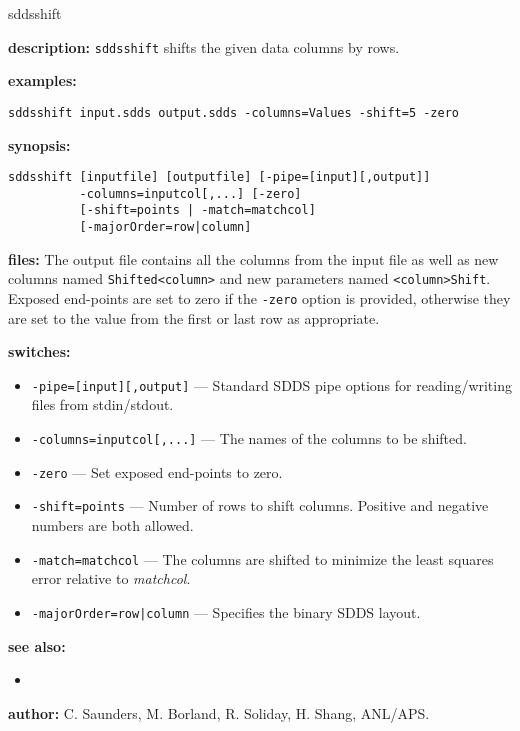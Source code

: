 \begin{sddsprog}{sddsshift}
  \item \textbf{description:} \verb|sddsshift| shifts the given data columns by rows.
  \item \textbf{examples:}
\begin{verbatim}
sddsshift input.sdds output.sdds -columns=Values -shift=5 -zero
\end{verbatim}
  \item \textbf{synopsis:}
\begin{verbatim}
sddsshift [inputfile] [outputfile] [-pipe=[input][,output]]
          -columns=inputcol[,...] [-zero]
          [-shift=points | -match=matchcol]
          [-majorOrder=row|column]
\end{verbatim}
  \item \textbf{files:}
  The output file contains all the columns from the input file as well as new columns named \verb|Shifted<column>| and new parameters named \verb|<column>Shift|. Exposed end-points are set to zero if the \verb|-zero| option is provided, otherwise they are set to the value from the first or last row as appropriate.
  \item \textbf{switches:}
  \begin{itemize}
    \item \verb|-pipe=[input][,output]| --- Standard SDDS pipe options for reading/writing files from stdin/stdout.
    \item \verb|-columns=inputcol[,...]| --- The names of the columns to be shifted.
    \item \verb|-zero| --- Set exposed end-points to zero.
    \item \verb|-shift=points| --- Number of rows to shift columns. Positive and negative numbers are both allowed.
    \item \verb|-match=matchcol| --- The columns are shifted to minimize the least squares error relative to \emph{matchcol}.
    \item \verb+-majorOrder=row|column+ --- Specifies the binary SDDS layout.
  \end{itemize}
  \item \textbf{see also:}
  \begin{itemize}
    \item {}
  \end{itemize}
  \item \textbf{author:} C. Saunders, M. Borland, R. Soliday, H. Shang, ANL/APS.
\end{sddsprog}
